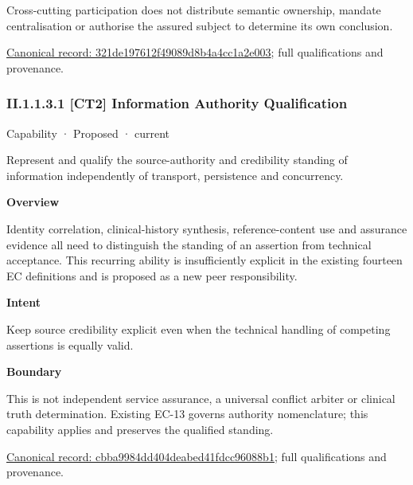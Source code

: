 Cross-cutting participation does not distribute semantic ownership, mandate centralisation or authorise the assured subject to determine its own conclusion.


{\footnotesize \href{../../../../continuum/strategy/capability/321de197612f49089d8b4a4cc1a2e003.md}{Canonical record: 321de197612f49089d8b4a4cc1a2e003}; full qualifications and provenance.}\par
\subsubsection*{II.1.1.3.1 [CT2] Information Authority Qualification}
\label{navigation:II.1.1.3.1}

\label{element:cbba9984dd404deabed41fdcc96088b1}
{\small Capability · Proposed · current}\par

Represent and qualify the source-authority and credibility standing of information independently of transport, persistence and concurrency.



\textbf{Overview}



Identity correlation, clinical-history synthesis, reference-content use and assurance evidence all need to distinguish the standing of an assertion from technical acceptance. This recurring ability is insufficiently explicit in the existing fourteen EC definitions and is proposed as a new peer responsibility.



\textbf{Intent}



Keep source credibility explicit even when the technical handling of competing assertions is equally valid.



\textbf{Boundary}



This is not independent service assurance, a universal conflict arbiter or clinical truth determination. Existing EC-13 governs authority nomenclature; this capability applies and preserves the qualified standing.


{\footnotesize \href{../../../../continuum/strategy/capability/cbba9984dd404deabed41fdcc96088b1.md}{Canonical record: cbba9984dd404deabed41fdcc96088b1}; full qualifications and provenance.}\par
